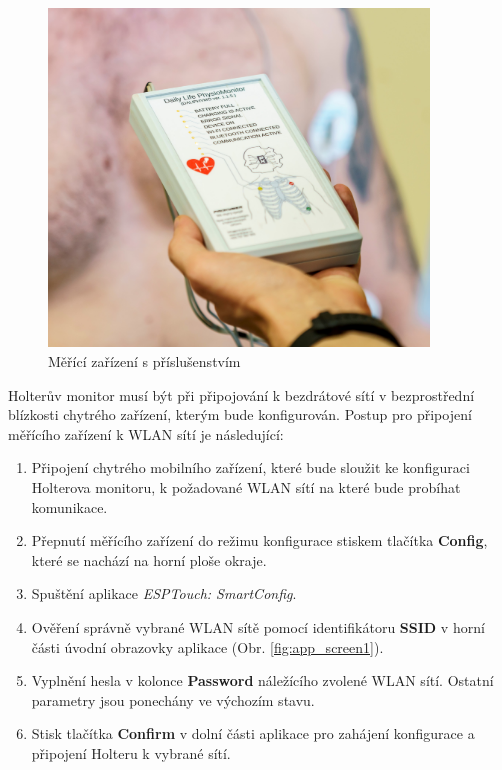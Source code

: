 \begin{figure}[H]
    \begin{center}
        \includegraphics[width=0.9\textwidth]{../assets/device/holter1}
        \caption{Měřící zařízení s příslušenstvím}
        \label{fig:device}
    \end{center}
\end{figure}

Holterův monitor musí být při připojování k bezdrátové sítí v bezprostřední
blízkosti chytrého zařízení, kterým bude konfigurován. Postup pro připojení
měřícího zařízení k WLAN sítí je následující:

\begin{enumerate}
    \item Připojení chytrého mobilního zařízení, které bude sloužit ke
          konfiguraci Holterova monitoru, k požadované WLAN sítí na které bude
          probíhat komunikace.
    \item Přepnutí měřícího zařízení do režimu konfigurace stiskem tlačítka
          \textbf{Config}, které se nachází na horní ploše okraje.
    \item Spuštění aplikace \textit{ESPTouch: SmartConfig}.
    \item Ověření správně vybrané WLAN sítě pomocí identifikátoru \textbf{SSID}
          v horní části úvodní obrazovky aplikace (Obr. \ref{fig:app_screen1}).
    \item Vyplnění hesla v kolonce \textbf{Password} náležícího zvolené WLAN
          sítí. Ostatní parametry jsou ponechány ve výchozím stavu.
    \item Stisk tlačítka \textbf{Confirm} v dolní části aplikace pro zahájení
          konfigurace a připojení Holteru k vybrané sítí.
\end{enumerate}

